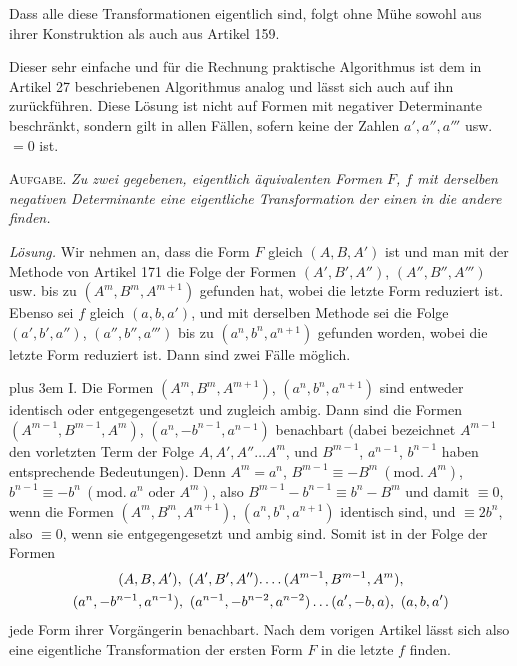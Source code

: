 Dass alle diese Transformationen eigentlich sind, folgt ohne Mühe sowohl aus ihrer Konstruktion als auch aus Artikel 159.

Dieser sehr einfache und für die Rechnung praktische Algorithmus ist dem in Artikel 27 beschriebenen Algorithmus analog und lässt sich auch auf ihn zurückführen. Diese Lösung
ist nicht auf Formen mit negativer Determinante beschränkt, sondern gilt in allen Fällen, sofern keine der Zahlen $a',a'',a'''$ usw. $=0$ ist.

\textsc{Aufgabe.} \emph{Zu zwei gegebenen, eigentlich äquivalenten Formen $F$, $f$ mit derselben negativen Determinante eine eigentliche Transformation der einen in die andere finden.}

\emph{Lösung.} Wir nehmen an, dass die Form $F$ gleich $(A,B,A')$ ist und man mit der Methode von Artikel 171 die Folge der Formen $(A',B',A'')$, $(A'',B'',A''')$ usw. bis zu $(A^m,B^m,A^{m+1})$ gefunden hat, wobei die letzte Form reduziert ist. Ebenso sei $f$ gleich $(a,b,a')$, und mit derselben Methode sei die Folge $(a',b',a'')$, $(a'',b'',a''')$ bis zu $(a^n,b^n,a^{n+1})$ gefunden worden, wobei die letzte Form reduziert ist. Dann sind zwei Fälle möglich.

\begingroup\rightskip=0pt plus 3em\relax
I. Die Formen $(A^m,B^m,A^{m+1})$, $(a^n,b^n,a^{n+1})$ sind entweder identisch oder entgegengesetzt und zugleich ambig. Dann sind die Formen $(A^{m-1},B^{m-1},A^m)$, $(a^n,-b^{n-1},a^{n-1})$ benachbart (dabei bezeichnet $A^{m-1}$ den vorletzten Term der Folge $A,A',A''\ldots A^m$, und $B^{m-1}$, $a^{n-1}$, $b^{n-1}$ haben entsprechende Bedeutungen). Denn $A^m=a^n$, $B^{m-1}\equiv-B^m\ (\mathrm{mod.}\ A^m)$, $b^{n-1}\equiv-b^n\ (\mathrm{mod.}\ a^n\text{ oder }A^m)$, also $B^{m-1}-b^{n-1}\equiv b^n-B^m$ und damit $\equiv0$, wenn die Formen $(A^m,B^m,A^{m+1})$, $(a^n,b^n,a^{n+1})$ identisch sind, und $\equiv2b^n$, also $\equiv0$, wenn sie entgegengesetzt und ambig sind. Somit ist in der Folge der Formen
\[
\begin{gathered}
(A,B,A'),\ (A',B',A'')\ldotp\ldotp\ldotp\ldotp(A^{m-1},B^{m-1},A^m),\\
(a^n,-b^{n-1},a^{n-1}),\ (a^{n-1},-b^{n-2},a^{n-2})\ldots(a',-b,a),\ (a,b,a')
\end{gathered}
\]
jede Form ihrer Vorgängerin benachbart. Nach dem vorigen Artikel lässt sich also eine eigentliche Transformation der ersten Form $F$ in die letzte $f$ finden.
\par\endgroup

